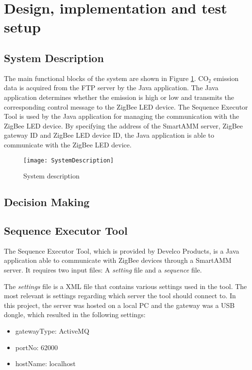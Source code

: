 \documentclass[Main]{subfiles}
\begin{document}
\section{Design, implementation and test setup} %
\label{sec:design_implementation_test_setup}

	\subsection{System Description}
		The main functional blocks of the system are shown in Figure \ref{fig:sysDesc}. 
		CO$_2$ emission data is acquired from the FTP server by the Java application. The Java application determines whether the emission is high or low and transmits the corresponding control message to the ZigBee LED device. 
		The Sequence Executor Tool is used by the Java application for managing the communication with the ZigBee LED device. 
		By specifying the address of the SmartAMM server, ZigBee gateway ID and ZigBee LED device ID, the Java application is able to communicate with the ZigBee LED device.  

		\begin{figure}[H]
		\centering
		\texttt{[image: SystemDescription]}
		\caption{System description}
		\label{fig:sysDesc}
		\end{figure}




	\subsection{Decision Making}



	\subsection{Sequence Executor Tool}
		The Sequence Executor Tool, which is provided by Develco Products, is a Java application able to communicate with ZigBee devices through a SmartAMM server.
		It requires two input files: A \emph{setting} file and a \emph{sequence} file.

		The \emph{settings} file is a XML file that contains various settings used in the tool. 
		The most relevant is settings regarding which server the tool should connect to. 
		In this project, the server was hosted on a local PC and the gateway was a USB dongle, which resulted in the following settings:
		\begin{itemize}
			\item gatewayType: ActiveMQ
			\item portNo: 62000
			\item hostName: localhost
		\end{itemize}
\end{document}
